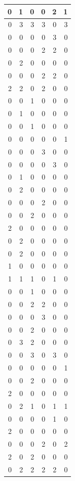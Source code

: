 \documentclass[
  12pt,
]{krantz}
\begin{document}
\begin{tabular}{r|r|r|r|r|r}
\hline
0 & 1 & 0 & 0 & 2 & 1\\
\hline
0 & 3 & 3 & 3 & 0 & 3\\
\hline
0 & 0 & 0 & 0 & 3 & 0\\
\hline
0 & 0 & 0 & 2 & 2 & 0\\
\hline
0 & 2 & 0 & 0 & 0 & 0\\
\hline
0 & 0 & 0 & 2 & 2 & 0\\
\hline
2 & 2 & 0 & 2 & 0 & 0\\
\hline
0 & 0 & 1 & 0 & 0 & 0\\
\hline
0 & 1 & 0 & 0 & 0 & 0\\
\hline
0 & 0 & 1 & 0 & 0 & 0\\
\hline
0 & 0 & 0 & 0 & 0 & 1\\
\hline
0 & 0 & 0 & 3 & 0 & 0\\
\hline
0 & 0 & 0 & 0 & 3 & 0\\
\hline
0 & 1 & 0 & 0 & 0 & 0\\
\hline
0 & 2 & 0 & 0 & 0 & 0\\
\hline
0 & 0 & 0 & 2 & 0 & 0\\
\hline
0 & 0 & 2 & 0 & 0 & 0\\
\hline
2 & 0 & 0 & 0 & 0 & 0\\
\hline
0 & 2 & 0 & 0 & 0 & 0\\
\hline
0 & 2 & 0 & 0 & 0 & 0\\
\hline
1 & 0 & 0 & 0 & 0 & 0\\
\hline
1 & 1 & 1 & 0 & 1 & 0\\
\hline
0 & 0 & 1 & 0 & 0 & 0\\
\hline
0 & 0 & 2 & 2 & 0 & 0\\
\hline
0 & 0 & 0 & 3 & 0 & 0\\
\hline
0 & 0 & 2 & 0 & 0 & 0\\
\hline
0 & 3 & 2 & 0 & 0 & 0\\
\hline
0 & 0 & 3 & 0 & 3 & 0\\
\hline
0 & 0 & 0 & 0 & 0 & 1\\
\hline
0 & 0 & 2 & 0 & 0 & 0\\
\hline
2 & 0 & 0 & 0 & 0 & 0\\
\hline
0 & 2 & 1 & 0 & 1 & 1\\
\hline
0 & 0 & 0 & 0 & 1 & 0\\
\hline
2 & 0 & 0 & 0 & 0 & 0\\
\hline
0 & 0 & 0 & 2 & 0 & 2\\
\hline
2 & 0 & 2 & 0 & 0 & 0\\
\hline
0 & 2 & 2 & 2 & 2 & 0\\

\end{tabular}
\end{document}
